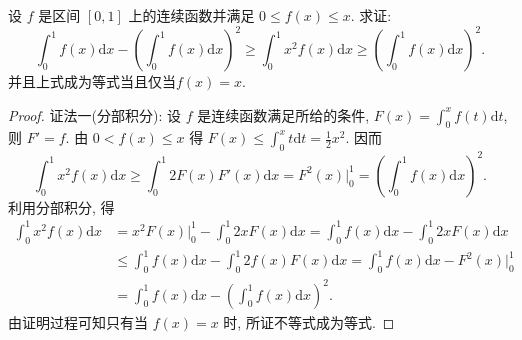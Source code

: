 \documentclass[../../main.tex]{subfiles}
\begin{document}
\begin{example}
设 $f$ 是区间 $[0,1]$ 上的连续函数并满足 $0\leqslant  f(x)\leqslant  x$. 求证:
$$\int_0^1 f(x)\mathrm{d}x-\left(\int_0^1 f(x)\mathrm{d}x\right)^2\geqslant \int_0^1 x^2f(x)\mathrm{d}x\geqslant \left(\int_0^1 f(x)\mathrm{d}x\right)^2.$$
并且上式成为等式当且仅当$f(x)=x$.
\end{example}
\begin{proof}
{\color{blue}证法一(分部积分):}
设 $f$ 是连续函数满足所给的条件, $F(x)=\int_0^x f(t)\mathrm{d}t$, 则 $F'=f$. 由 $0<f(x)\leqslant  x$ 得 $F(x)\leqslant \int_0^x t\mathrm{d}t=\frac{1}{2}x^2$. 因而
$$\int_0^1 x^2f(x)\mathrm{d}x\geqslant \int_0^1 2F(x)F'(x)\mathrm{d}x=F^2(x)\bigg|_0^1=\left(\int_0^1 f(x)\mathrm{d}x\right)^2.$$
利用分部积分, 得
$$
\begin{aligned}
\int_0^1 x^2f(x)\mathrm{d}x &= x^2F(x)\bigg|_0^1-\int_0^1 2xF(x)\mathrm{d}x = \int_0^1 f(x)\mathrm{d}x-\int_0^1 2xF(x)\mathrm{d}x \\
&\leqslant  \int_0^1 f(x)\mathrm{d}x-\int_0^1 2f(x)F(x)\mathrm{d}x = \int_0^1 f(x)\mathrm{d}x-F^2(x)\bigg|_0^1 \\
&= \int_0^1 f(x)\mathrm{d}x-\left(\int_0^1 f(x)\mathrm{d}x\right)^2.
\end{aligned}
$$
由证明过程可知只有当 $f(x)=x$ 时, 所证不等式成为等式.


\end{proof}
\end{document}
